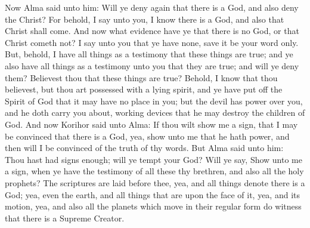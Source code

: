 Now Alma said unto him: Will ye deny again that there is a God, and also deny the Christ? For behold, I say unto you, I know there is a God, and also that Christ shall come.
\bverse \iffalse And now what evidence have ye that there is no God, or that Christ cometh not? I say unto you that ye have none, save it be your word only. \fi
And now what evidence have ye that there is no God, or that Christ cometh not? I say unto you that ye have none, save it be your word only.
\bverse \iffalse But, behold, I have all things as a testimony that these things are true; and ye also have all things as a testimony unto you that they are true; and will ye deny them? Believest thou that these things are true? \fi
But, behold, I have all things as a testimony that these things are true; and ye also have all things as a testimony unto you that they are true; and will ye deny them? Believest thou that these things are true?
\bverse \iffalse Behold, I know that thou believest, but thou art possessed with a lying spirit, and ye have put off the Spirit of God that it may have no place in you; but the devil has power over you, and he doth carry you about, working devices that he may destroy the children of God. \fi
Behold, I know that thou believest, but thou art possessed with a lying spirit, and ye have put off the Spirit of God that it may have no place in you; but the devil has power over you, and he doth carry you about, working devices that he may destroy the children of God.
\bverse \iffalse And now Korihor said unto Alma: If thou wilt show me a sign, that I may be convinced that there is a God, yea, show unto me that he hath power, and then will I be convinced of the truth of thy words. \fi
And now Korihor said unto Alma: If thou wilt show me a sign, that I may be convinced that there is a God, yea, show unto me that he hath power, and then will I be convinced of the truth of thy words.
\bverse \iffalse But Alma said unto him: Thou hast had signs enough; will ye tempt your God? Will ye say, Show unto me a sign, when ye have the testimony of all these thy brethren, and also all the holy prophets? The scriptures are laid before thee, yea, and all things denote there is a God; yea, even the earth, and all things that are upon the face of it, yea, and its motion, yea, and also all the planets which move in their regular form do witness that there is a Supreme Creator. \fi
But Alma said unto him: Thou hast had signs enough; will ye tempt your God? Will ye say, Show unto me a sign, when ye have the testimony of all these thy brethren, and also all the holy prophets? The scriptures are laid before thee, yea, and all things denote there is a God; yea, even the earth, and all things that are upon the face of it, yea, and its motion, yea, and also all the planets which move in their regular form do witness that there is a Supreme Creator.
